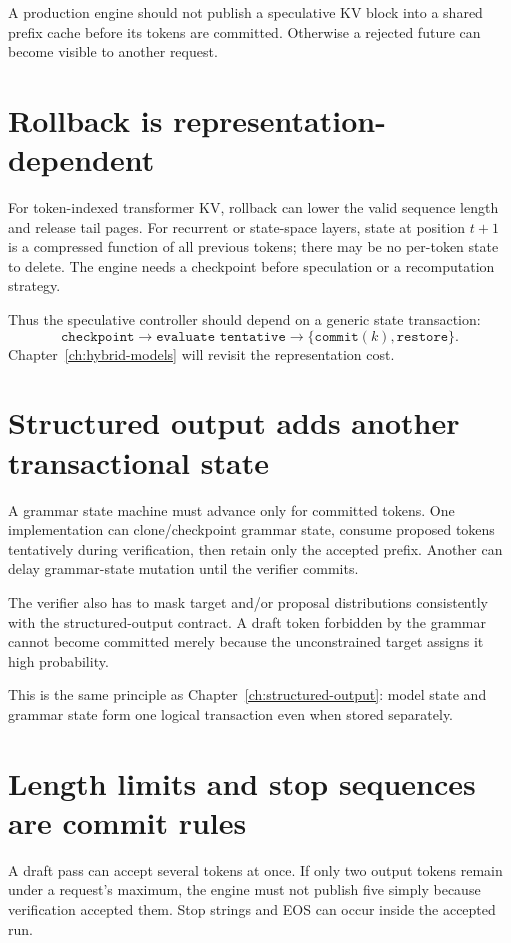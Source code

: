 A production engine should not publish a speculative KV block into a shared prefix
cache before its tokens are committed. Otherwise a rejected future can become visible
to another request.

\section{Rollback is representation-dependent}

For token-indexed transformer KV, rollback can lower the valid sequence length and
release tail pages. For recurrent or state-space layers, state at position $t+1$ is a
compressed function of all previous tokens; there may be no per-token state to delete.
The engine needs a checkpoint before speculation or a recomputation strategy.

Thus the speculative controller should depend on a generic state transaction:
\[
\texttt{checkpoint}\rightarrow\texttt{evaluate tentative}
\rightarrow\{\texttt{commit}(k),\texttt{restore}\}.
\]
Chapter~\ref{ch:hybrid-models} will revisit the representation cost.

\section{Structured output adds another transactional state}

A grammar state machine must advance only for committed tokens. One implementation can
clone/checkpoint grammar state, consume proposed tokens tentatively during verification,
then retain only the accepted prefix. Another can delay grammar-state mutation until
the verifier commits.

The verifier also has to mask target and/or proposal distributions consistently with
the structured-output contract. A draft token forbidden by the grammar cannot become
committed merely because the unconstrained target assigns it high probability.

This is the same principle as Chapter~\ref{ch:structured-output}: model state and
grammar state form one logical transaction even when stored separately.

\section{Length limits and stop sequences are commit rules}

A draft pass can accept several tokens at once. If only two output tokens remain under
a request's maximum, the engine must not publish five simply because verification
accepted them. Stop strings and EOS can occur inside the accepted run.


